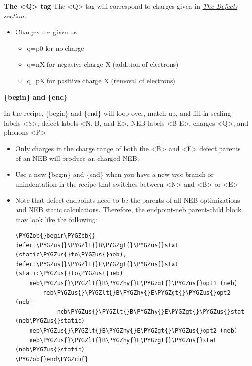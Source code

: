 \documentclass[letterpaper,10pt,english]{sphinxmanual}
\def\PYGZus{\char`\_}
\def\PYGZob{\char`\{}
\def\PYGZcb{\char`\}}
\def\PYGZlt{\char`\<}
\def\PYGZgt{\char`\>}
\def\PYGZhy{\char`\-}
\begin{document}
\textbf{The \textless{}Q\textgreater{} tag}
The \textless{}Q\textgreater{} tag will correspond to charges given in {\hyperref[3_1_5_defects::doc]{\emph{The Defects section}}}.
\begin{itemize}
\item {} 
Charges are given as
\begin{itemize}
\item {} 
q=p0 for no charge

\item {} 
q=nX for negative charge X (addition of electrons)

\item {} 
q=pX for positive charge X (removal of electrons)

\end{itemize}

\end{itemize}

\textbf{\{begin\} and \{end\}}

In the recipe, \{begin\} and \{end\} will loop over, match up, and fill in scaling labels \textless{}S\textgreater{}, defect labels \textless{}N, B, and E\textgreater{}, NEB labels \textless{}B-E\textgreater{}, charges \textless{}Q\textgreater{}, and phonons \textless{}P\textgreater{}
\begin{itemize}
\item {} 
Only charges in the charge range of both the \textless{}B\textgreater{} and \textless{}E\textgreater{} defect parents of an NEB will produce an charged NEB.

\item {} 
Use a new \{begin\} and \{end\} when you have a new tree branch or unindentation in the recipe that switches between \textless{}N\textgreater{} and \textless{}B\textgreater{} or \textless{}E\textgreater{}

\item {} 
Note that defect endpoints need to be the parents of all NEB optimizations and NEB static calculations. Therefore, the endpoint-neb parent-child block may look like the following:

\begin{Verbatim}[commandchars=\\\{\}]
\PYGZob{}begin\PYGZcb{}
defect\PYGZus{}\PYGZlt{}B\PYGZgt{}\PYGZus{}stat (static\PYGZus{}to\PYGZus{}neb), defect\PYGZus{}\PYGZlt{}E\PYGZgt{}\PYGZus{}stat (static\PYGZus{}to\PYGZus{}neb)
    neb\PYGZus{}\PYGZlt{}B\PYGZhy{}E\PYGZgt{}\PYGZus{}opt1 (neb)
        neb\PYGZus{}\PYGZlt{}B\PYGZhy{}E\PYGZgt{}\PYGZus{}opt2 (neb)
            neb\PYGZus{}\PYGZlt{}B\PYGZhy{}E\PYGZgt{}\PYGZus{}stat (neb\PYGZus{}static)
    neb\PYGZus{}\PYGZlt{}B\PYGZhy{}E\PYGZgt{}\PYGZus{}opt2 (neb)
    neb\PYGZus{}\PYGZlt{}B\PYGZhy{}E\PYGZgt{}\PYGZus{}stat (neb\PYGZus{}static)
\PYGZob{}end\PYGZcb{}
\end{Verbatim}

\end{itemize}
\end{document}
